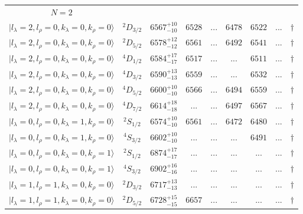 \begin{tabular}{c c| c c c c c c c}
\hline
 $N=2$  &  &  &  &  &  \\ 
$\vert l_{\lambda}\!\!=\!2, l_{\rho}\!\!=\!0, k_{\lambda}\!\!=\!0, k_{\rho}\!\!=\!0 \rangle$ & $^{2}D_{3/2}$ & $6567^{+10}_{-10}$ & $6528$ & ... & $6478$ & $6522$ & ... & $\dagger$ \\ 
$\vert l_{\lambda}\!\!=\!2, l_{\rho}\!\!=\!0, k_{\lambda}\!\!=\!0, k_{\rho}\!\!=\!0 \rangle$ & $^{2}D_{5/2}$ & $6578^{+12}_{-12}$ & $6561$ & ... & $6492$ & $6541$ & ... & $\dagger$ \\ 
$\vert l_{\lambda}\!\!=\!2, l_{\rho}\!\!=\!0, k_{\lambda}\!\!=\!0, k_{\rho}\!\!=\!0 \rangle$ & $^{4}D_{1/2}$ & $6584^{+17}_{-17}$ & $6517$ & ... & ... & $6511$ & ... & $\dagger$ \\ 
$\vert l_{\lambda}\!\!=\!2, l_{\rho}\!\!=\!0, k_{\lambda}\!\!=\!0, k_{\rho}\!\!=\!0 \rangle$ & $^{4}D_{3/2}$ & $6590^{+13}_{-13}$ & $6559$ & ... & ... & $6532$ & ... & $\dagger$ \\ 
$\vert l_{\lambda}\!\!=\!2, l_{\rho}\!\!=\!0, k_{\lambda}\!\!=\!0, k_{\rho}\!\!=\!0 \rangle$ & $^{4}D_{5/2}$ & $6600^{+10}_{-10}$ & $6566$ & ... & $6494$ & $6559$ & ... & $\dagger$ \\ 
$\vert l_{\lambda}\!\!=\!2, l_{\rho}\!\!=\!0, k_{\lambda}\!\!=\!0, k_{\rho}\!\!=\!0 \rangle$ & $^{4}D_{7/2}$ & $6614^{+18}_{-18}$ & ... & ... & $6497$ & $6567$ & ... & $\dagger$ \\ 
$\vert l_{\lambda}\!\!=\!0, l_{\rho}\!\!=\!0, k_{\lambda}\!\!=\!1, k_{\rho}\!\!=\!0 \rangle$ & $^{2}S_{1/2}$ & $6574^{+10}_{-10}$ & $6561$ & ... & $6472$ & $6480$ & ... & $\dagger$ \\ 
$\vert l_{\lambda}\!\!=\!0, l_{\rho}\!\!=\!0, k_{\lambda}\!\!=\!1, k_{\rho}\!\!=\!0 \rangle$ & $^{4}S_{3/2}$ & $6602^{+10}_{-10}$ & ... & ... & ... & $6491$ & ... & $\dagger$ \\ 
$\vert l_{\lambda}\!\!=\!0, l_{\rho}\!\!=\!0, k_{\lambda}\!\!=\!0, k_{\rho}\!\!=\!1 \rangle$ & $^{2}S_{1/2}$ & $6874^{+17}_{-17}$ & ... & ... & ... & ... & ... & $\dagger$ \\ 
$\vert l_{\lambda}\!\!=\!0, l_{\rho}\!\!=\!0, k_{\lambda}\!\!=\!0, k_{\rho}\!\!=\!1 \rangle$ & $^{4}S_{3/2}$ & $6902^{+16}_{-16}$ & ... & ... & ... & ... & ... & $\dagger$ \\ 
$\vert l_{\lambda}\!\!=\!1, l_{\rho}\!\!=\!1, k_{\lambda}\!\!=\!0, k_{\rho}\!\!=\!0 \rangle$ & $^{2}D_{3/2}$ & $6717^{+13}_{-13}$ & ... & ... & ... & ... & ... & $\dagger$ \\ 
$\vert l_{\lambda}\!\!=\!1, l_{\rho}\!\!=\!1, k_{\lambda}\!\!=\!0, k_{\rho}\!\!=\!0 \rangle$ & $^{2}D_{5/2}$ & $6728^{+15}_{-15}$ & $6657$ & ... & ... & ... & ... & $\dagger$ \\ 

\end{tabular}
